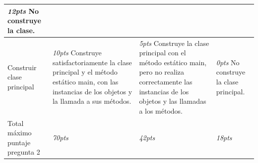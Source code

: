 \documentclass[10pt]{article}
\begin{document}
{\begin{center}
\begin{tabular}{|p{2cm}|p{4cm}|p{4cm}|p{4cm}|}
                \emph{12pts} No construye la clase. \\ \hline
                Construir clase principal & 
                \emph{10pts} Construye satisfactoriamente la clase principal y el m\'etodo est\'atico main, con las instancias de los objetos y la llamada a sus m\'etodos. & 
                \emph{5pts} Construye la clase principal con el m\'etodo est\'atico main, pero no realiza correctamente las instancias de los objetos y las llamadas a los m\'etodos. & 
                \emph{0pts} No construye la clase principal. \\ \hline
                Total m\'aximo puntaje pregunta 2 & 
                \emph{70pts} & 
                \emph{42pts} & 
                \emph{18pts} \\ \hline
            \end{tabular}
        \end{center}

    }
\end{document}
